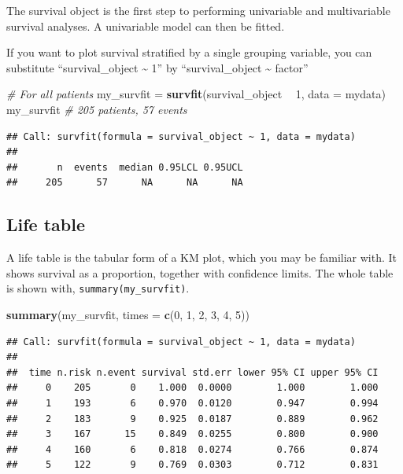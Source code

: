 \documentclass[12pt,]{krantz}
\makeatletter
\newenvironment{Shaded}{\begin{snugshade}}{\end{snugshade}}
\newcommand{\CommentTok}[1]{\textcolor[rgb]{0.56,0.35,0.01}{\textit{#1}}}
\newcommand{\DataTypeTok}[1]{\textcolor[rgb]{0.13,0.29,0.53}{#1}}
\newcommand{\DecValTok}[1]{\textcolor[rgb]{0.00,0.00,0.81}{#1}}
\newcommand{\KeywordTok}[1]{\textcolor[rgb]{0.13,0.29,0.53}{\textbf{#1}}}
\newcommand{\NormalTok}[1]{#1}
\newcommand{\OperatorTok}[1]{\textcolor[rgb]{0.81,0.36,0.00}{\textbf{#1}}}
\newcommand{\StringTok}[1]{\textcolor[rgb]{0.31,0.60,0.02}{#1}}
\newenvironment{kframe}{%
\medskip{}
\setlength{\fboxsep}{.8em}
 \def\at@end@of@kframe{}%
 \ifinner\ifhmode%
  \def\at@end@of@kframe{\end{minipage}}%
  \begin{minipage}{\columnwidth}%
 \fi\fi%
 \def\FrameCommand##1{\hskip\@totalleftmargin \hskip-\fboxsep
 \colorbox{shadecolor}{##1}\hskip-\fboxsep
     \hskip-\linewidth \hskip-\@totalleftmargin \hskip\columnwidth}%
 \MakeFramed {\advance\hsize-\width
   \@totalleftmargin\z@ \linewidth\hsize
   \@setminipage}}%
 {\par\unskip\endMakeFramed%
 \at@end@of@kframe}
\renewenvironment{Shaded}{\begin{kframe}}{\end{kframe}}
\theoremstyle{definition}
\theoremstyle{definition}
\theoremstyle{definition}
\theoremstyle{remark}
\makeatother
\begin{document}
The survival object is the first step to performing univariable and
multivariable survival analyses. A univariable model can then be fitted.

If you want to plot survival stratified by a single grouping variable,
you can substitute ``survival\_object \textasciitilde{} 1'' by
``survival\_object \textasciitilde{} factor''

\begin{Shaded}
\begin{Highlighting}[]
\CommentTok{# For all patients}
\NormalTok{my_survfit =}\StringTok{ }\KeywordTok{survfit}\NormalTok{(survival_object }\OperatorTok{~}\StringTok{ }\DecValTok{1}\NormalTok{, }\DataTypeTok{data =}\NormalTok{ mydata)}
\NormalTok{my_survfit }\CommentTok{# 205 patients, 57 events}
\end{Highlighting}
\end{Shaded}

\begin{verbatim}
## Call: survfit(formula = survival_object ~ 1, data = mydata)
## 
##       n  events  median 0.95LCL 0.95UCL 
##     205      57      NA      NA      NA
\end{verbatim}

\hypertarget{life-table}{%
\subsection{Life table}\label{life-table}}

A life table is the tabular form of a KM plot, which you may be familiar
with. It shows survival as a proportion, together with confidence
limits. The whole table is shown with, \texttt{summary(my\_survfit)}.

\begin{Shaded}
\begin{Highlighting}[]
\KeywordTok{summary}\NormalTok{(my_survfit, }\DataTypeTok{times =} \KeywordTok{c}\NormalTok{(}\DecValTok{0}\NormalTok{, }\DecValTok{1}\NormalTok{, }\DecValTok{2}\NormalTok{, }\DecValTok{3}\NormalTok{, }\DecValTok{4}\NormalTok{, }\DecValTok{5}\NormalTok{))}
\end{Highlighting}
\end{Shaded}

\begin{verbatim}
## Call: survfit(formula = survival_object ~ 1, data = mydata)
## 
##  time n.risk n.event survival std.err lower 95% CI upper 95% CI
##     0    205       0    1.000  0.0000        1.000        1.000
##     1    193       6    0.970  0.0120        0.947        0.994
##     2    183       9    0.925  0.0187        0.889        0.962
##     3    167      15    0.849  0.0255        0.800        0.900
##     4    160       6    0.818  0.0274        0.766        0.874
##     5    122       9    0.769  0.0303        0.712        0.831
\end{verbatim}
\end{document}
